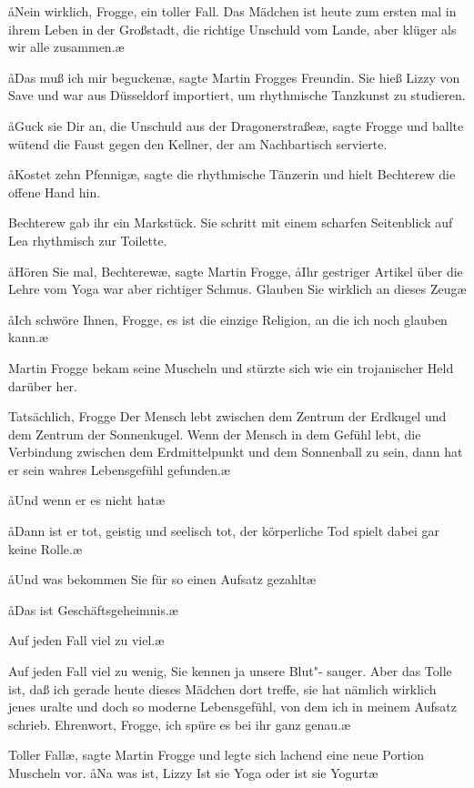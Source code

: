 \aa{}Nein wirklich, Frogge, ein toller Fall. Das Mädchen ist heute
zum ersten mal in ihrem Leben in der Großstadt, die richtige
Unschuld vom Lande, aber klüger als wir alle zusammen.\ae{}

\aa{}Das muß ich mir begucken\ae{}, sagte Martin Frogges Freundin.
Sie hieß Lizzy von Save und war aus Düsseldorf importiert,
um rhythmische Tanzkunst zu studieren.

\aa{}Guck sie Dir an, die Unschuld aus der Dragonerstraße\ae{},
sagte Frogge und ballte wütend die Faust gegen den Kellner,
der am Nachbartisch servierte.

\aa{}Kostet zehn Pfennig\ae{}, sagte die rhythmische Tänzerin und
hielt Bechterew die offene Hand hin.

Bechterew gab ihr ein Markstück. Sie schritt mit einem
scharfen Seitenblick auf Lea rhythmisch zur Toilette.

\aa{}Hören Sie mal, Bechterew\ae{}, sagte Martin Frogge, \aa{}Ihr
gestriger Artikel über die Lehre vom Yoga war aber richtiger
Schmus. Glauben Sie wirklich an dieses Zeug\frag{}\ae{}

\aa{}Ich schwöre Ihnen, Frogge, es ist die einzige Religion, an
die ich noch glauben kann.\ae{}

Martin Frogge bekam seine Muscheln und stürzte sich wie ein
trojanischer Held darüber her.

\aanah{}Tatsächlich, Frogge\ausr{} Der Mensch lebt zwischen dem Zentrum
der Erdkugel und dem Zentrum der Sonnenkugel. Wenn der
Mensch in dem Gefühl lebt, die Verbindung zwischen dem
Erdmittelpunkt und dem Sonnenball zu sein, dann hat er
sein wahres Lebensgefühl gefunden.\ae{}

\aa{}Und wenn er es nicht hat\frag{}\ae{}

\aa{}Dann ist er tot, geistig und seelisch tot, der körperliche Tod
spielt dabei gar keine Rolle.\ae{}

\aa{}Und was bekommen Sie für so einen Aufsatz gezahlt\frag{}\ae{}

\aa{}Das ist Geschäftsgeheimnis.\ae{}

\aanah{}Auf jeden Fall viel zu viel.\ae{}

\aanah{}Auf jeden Fall viel zu wenig, Sie kennen ja unsere Blut"-%
sauger. Aber das Tolle ist, daß ich gerade heute dieses
Mädchen dort treffe, sie hat nämlich wirklich jenes uralte und
doch so moderne Lebensgefühl, von dem ich in meinem
Aufsatz schrieb. Ehrenwort, Frogge, ich spüre es bei ihr ganz
genau.\ae{}

\aanah{}Toller Fall\ae{}, sagte Martin Frogge und legte sich lachend eine
neue Portion Muscheln vor. \aa{}Na was ist, Lizzy\frag{} Ist sie Yoga
oder ist sie Yogurt\frag{}\ae{}

